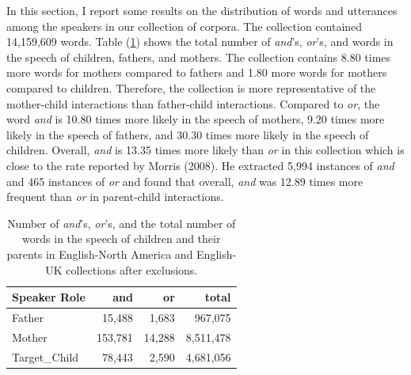 \documentclass[floatsintext,man]{apa6}
\theoremstyle{definition}
\theoremstyle{definition}
\theoremstyle{definition}
\theoremstyle{remark}
\begin{document}
In this section, I report some results on the distribution of words and
utterances among the speakers in our collection of corpora. The
collection contained 14,159,609 words. Table (\ref{tab:countTable})
shows the total number of \emph{and}'s, \emph{or}'s, and words in the
speech of children, fathers, and mothers. The collection contains 8.80
times more words for mothers compared to fathers and 1.80 more words for
mothers compared to children. Therefore, the collection is more
representative of the mother-child interactions than father-child
interactions. Compared to \emph{or}, the word \emph{and} is 10.80 times
more likely in the speech of mothers, 9.20 times more likely in the
speech of fathers, and 30.30 times more likely in the speech of
children. Overall, \emph{and} is 13.35 times more likely than \emph{or}
in this collection which is close to the rate reported by Morris (2008).
He extracted 5,994 instances of \emph{and} and 465 instances of
\emph{or} and found that overall, \emph{and} was 12.89 times more
frequent than \emph{or} in parent-child interactions.

\begin{table}

\caption{\label{tab:countTable}Number of \textit{and}'s, \textit{or}'s, and the total number of words in the speech of children and their parents in English-North America and English-UK collections after exclusions.}
\centering
\begin{tabular}[t]{l|r|r|r}
\hline
Speaker Role & and & or & total\\
\hline
Father & 15,488 & 1,683 & 967,075\\
\hline
Mother & 153,781 & 14,288 & 8,511,478\\
\hline
Target\_Child & 78,443 & 2,590 & 4,681,056\\
\hline
\end{tabular}
\end{table}
\end{document}
